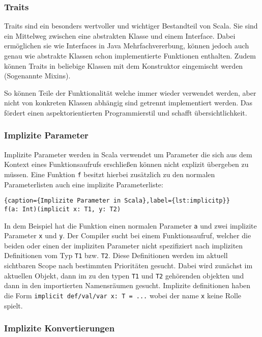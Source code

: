 \subsubsection{Traits}

Traits sind ein besonders wertvoller und wichtiger Bestandteil von Scala. Sie sind ein Mittelweg
zwischen eine abstrakten Klasse und einem Interface. Dabei ermöglichen sie wie Interfaces in Java
Mehrfachvererbung, können jedoch auch genau wie abstrakte Klassen schon implementierte Funktionen
enthalten. Zudem können Traits in beliebige Klassen mit dem Konstruktor eingemischt werden
(Sogenannte Mixins).

So können Teile der Funktionalität welche immer wieder verwendet werden, aber nicht von konkreten
Klassen abhängig sind getrennt implementiert werden. Das fördert einen aspektorientierten
Programmierstil und schafft übersichtlichkeit.

\subsubsection{Implizite Parameter}

Implizite Parameter werden in Scala verwendet um Parameter die sich aus dem  Kontext eines
Funktionsaufrufs erschließen können nicht explizit übergeben zu müssen. Eine Funktion \texttt{f}
besitzt hierbei zusätzlich zu den normalen  Parameterlisten auch eine implizite Parameterliste:

\begin{lstlisting}{caption={Implizite Parameter in Scala},label={lst:implicitp}}
f(a: Int)(implicit x: T1, y: T2)
\end{lstlisting}

In dem Beispiel hat die Funktion einen normalen Parameter \texttt{a} und zwei  implizite Parameter
\texttt{x} und \texttt{y}. Der Compiler sucht bei einem  Funktionsaufruf, welcher die beiden oder
einen der impliziten Parameter nicht  spezifiziert nach impliziten Definitionen vom Typ \texttt{T1}
bzw. \texttt{T2}.  Diese Definitionen werden im aktuell sichtbaren Scope nach bestimmten
Prioritäten gesucht. Dabei wird zunächst im aktuellen Objekt, dann im zu den  typen \texttt{T1} und
\texttt{T2} gehörenden objekten und dann in den  importierten Namensräumen gesucht. Implizite
definitionen haben die Form  \texttt{implicit def/val/var x: T = ...} wobei der name \texttt{x}
keine Rolle  spielt.

\subsubsection{Implizite Konvertierungen}

